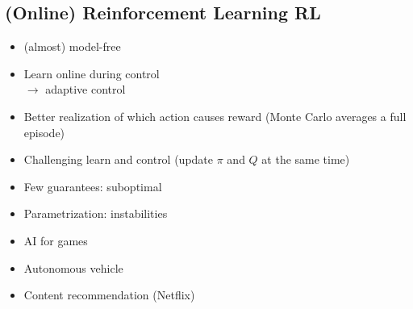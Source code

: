 \newpage

\begin{mdframed}[backgroundcolor=red!20, frametitlerulewidth=0pt, innertopmargin=-2mm, innerbottommargin=2mm, skipabove=0mm]
\section{(Online) Reinforcement Learning RL}
\end{mdframed}
\begin{minipage}{0.33\textwidth}
    \begin{tcolorbox}[colframe=green!50!black, colback=green!5!white, title=Pros, left=0.5mm, right=0.5mm]
    \begin{itemize}[leftmargin=*]
        \item (almost) model-free
        \item Learn online during control \\
        $\rightarrow$ adaptive control
        \item Better realization of which action causes reward (Monte Carlo averages a full episode)
    \end{itemize}
    \end{tcolorbox}
\end{minipage}
\begin{minipage}{0.33\textwidth}
    \begin{tcolorbox}[colframe=red!50!black, colback=red!5!white, title=Cons, left=0.5mm, right=0.5mm]
    \begin{itemize}[leftmargin=*]
        \item Challenging learn and control (update $\pi$ and $Q$ at the same time)
        \item Few guarantees: suboptimal
        \item Parametrization: instabilities
    \end{itemize}
    \end{tcolorbox}
\end{minipage}
\begin{minipage}{0.33\textwidth}
    \begin{tcolorbox}[colframe=gray!50!black, colback=gray!5!white, title=Examples, left=0.5mm, right=0.5mm]
    \begin{itemize}[leftmargin=*]
        \item AI for games
        \item Autonomous vehicle
        \item Content recommendation (Netflix)
    \end{itemize}
    \end{tcolorbox}
\end{minipage}

